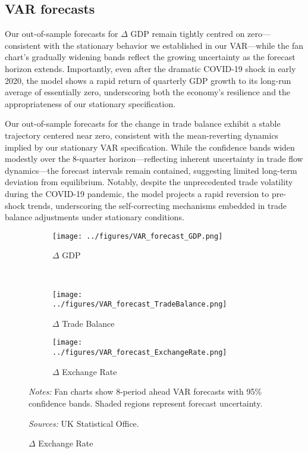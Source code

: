 \documentclass[
]{article}
\begin{document}
	
	\subsection{VAR forecasts}
	
	Our out-of-sample forecasts for $\Delta$ GDP remain tightly centred on zero—consistent 
	with the stationary behavior we established in our VAR—while the fan chart’s 
	gradually widening bands reflect the growing uncertainty as the forecast 
	horizon extends. Importantly, even after the dramatic COVID-19 shock in early 
	2020, the model shows a rapid return of quarterly GDP growth to its long-run 
	average of essentially zero, underscoring both the economy’s resilience and 
	the appropriateness of our stationary specification.
	
	Our out-of-sample forecasts for the change in trade balance exhibit a stable trajectory 
	centered near zero, consistent with the mean-reverting dynamics implied by our 
	stationary VAR specification. While the confidence bands widen modestly
	over the 8-quarter horizon—reflecting inherent uncertainty in trade flow
	dynamics—the forecast intervals remain contained, suggesting limited long-term 
	deviation from equilibrium. Notably, despite the unprecedented trade volatility 
	during the COVID-19 pandemic, the model projects a rapid reversion to pre-shock 
	trends, underscoring the self-correcting mechanisms embedded in trade balance 
	adjustments under stationary conditions.
	
	\begin{figure}[!htbp]
		\centering
		\caption{\textsc{VAR Forecasts Performance}}
		\label{fig:var_forecasts}
		
		\begin{subfigure}[b]{0.32\textwidth}
			\centering
			\texttt{[image: ../figures/VAR\_forecast\_GDP.png]}
			\caption{$\Delta$ GDP}
			\label{fig:forecast_gdp}
		\end{subfigure}
		\\
		\begin{subfigure}[b]{0.32\textwidth}
			\centering
			\texttt{[image: ../figures/VAR\_forecast\_TradeBalance.png]}
			\caption{$\Delta$ Trade Balance}
			\label{fig:forecast_tb}
		\end{subfigure}
		\begin{subfigure}[b]{0.32\textwidth}
			\centering
			\texttt{[image: ../figures/VAR\_forecast\_ExchangeRate.png]}
			\caption{$\Delta$ Exchange Rate}
			\label{fig:forecast_fx}
		\end{subfigure}
		
		\begin{minipage}{\textwidth}
			\footnotesize
			\textit{Notes:} Fan charts show 8-period ahead VAR forecasts with 95\% confidence bands. 
			Shaded regions represent forecast uncertainty. 
			
			\textit{Sources:} UK Statistical Office.
		\end{minipage}
	\end{figure}
	
\end{document}
